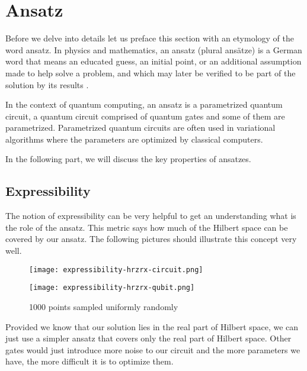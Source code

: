 \chapter{Ansatz}\label{ch:ansatz}
Before we delve into details let us preface this section with an etymology of the word ansatz. In physics and mathematics, an ansatz (plural ansätze) is a German word that means an educated guess, an initial point, or an additional assumption made to help solve a problem, and which may later be verified to be part of the solution by its results \cite{ansatz_etymology}.

In the context of quantum computing, an ansatz is a parametrized quantum circuit,  a quantum circuit comprised of quantum gates and some of them are parametrized. Parametrized quantum circuits are often used in variational algorithms where the parameters are optimized by classical computers.

In the following part, we will discuss the key properties of ansatzes.

\section{Expressibility}
The notion of expressibility can be very helpful to get an understanding what is the role of the ansatz. This metric says how much of the Hilbert space can be covered by our ansatz. The following pictures should illustrate this concept very well.

\begin{figure}[H]
        \centering
        \begin{minipage}{0.4\linewidth}
            \centering
            \texttt{[image: expressibility-hrzrx-circuit.png]}
            \vfill
        \end{minipage}
        \hfill
        \begin{minipage}{0.4\linewidth}
            \centering
            \texttt{[image: expressibility-hrzrx-qubit.png]}
            \vfill
        \end{minipage}
        \caption{1000 points sampled uniformly randomly}
\end{figure}

Provided we know that our solution lies in the real part of Hilbert space, we can just use a simpler ansatz that covers only the real part of Hilbert space. Other gates would just introduce more noise to our circuit and the more parameters we have, the more difficult it is to optimize them.


